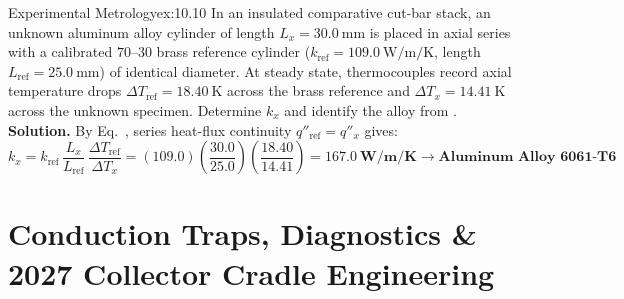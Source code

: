 \begin{workedexample}{Experimental Metrology}{ex:10.10}
In an insulated comparative cut-bar stack, an unknown aluminum alloy cylinder of length $L_x = \SI{30.0}{\milli\meter}$ is placed in axial series with a calibrated $70$--$30$ brass reference cylinder ($k_{\mathrm{ref}} = \SI{109.0}{\watt\per\meter\per\kelvin}$, length $L_{\mathrm{ref}} = \SI{25.0}{\milli\meter}$) of identical diameter. At steady state, thermocouples record axial temperature drops $\Delta T_{\mathrm{ref}} = \SI{18.40}{\kelvin}$ across the brass reference and $\Delta T_x = \SI{14.41}{\kelvin}$ across the unknown specimen. Determine $k_x$ and identify the alloy from .
\tcblower
\textbf{Solution.} By Eq.~, series heat-flux continuity $q''_{\mathrm{ref}} = q''_x$ gives:
\[
  k_x = k_{\mathrm{ref}}\,\frac{L_x}{L_{\mathrm{ref}}}\,\frac{\Delta T_{\mathrm{ref}}}{\Delta T_x} = (109.0)\!\left(\frac{30.0}{25.0}\right)\!\left(\frac{18.40}{14.41}\right) = \mathbf{\SI{167.0}{\watt\per\meter\per\kelvin}} \longrightarrow \textbf{Aluminum Alloy 6061-T6}
\]
\end{workedexample}

\section{Conduction Traps, Diagnostics \& 2027 Collector Cradle Engineering}
\label{sec:10.6}

